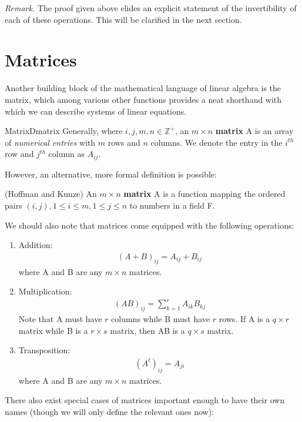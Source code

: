\documentclass[oneside]{book}
\begin{document}
	\textit{Remark.} The proof given above elides an explicit statement of the invertibility of each of these operations. This will be clarified in the next section.
	
	\newpage
	
	\section{Matrices}
	
	Another building block of the mathematical language of linear algebra is the matrix, which among various other functions provides a neat shorthand with which we can describe systems of linear equations.
	
	\begin{defn}{Matrix}{Dmatrix}
		Generally, where $i,j,m,n \in \mathbb{Z^+}$, an $m \times n$ \textbf{matrix} A is an array of \textit{numerical entries} with $m$ rows and $n$ columns. We denote the entry in the $i^{th}$ row and $j^{th}$ column as $A_{ij}$. 
		
		However, an alternative, more formal definition is possible:
		
		(Hoffman and Kunze) An $m \times n$ \textbf{matrix} A is a function mapping the ordered pairs $(i,j), 1 \leq i \leq m, 1 \leq j \leq n$ to numbers in a field F.
	\end{defn}
	We should also note that matrices come equipped with the following operations:
	\begin{enumerate}
		\item Addition: 
			\begin{align*}
				(A+B)_{ij}=A_{ij}+B_{ij}
			\end{align*}
		where A and B are any $m \times n$ matrices.
		\item Multiplication: 
			\begin{align*}
				(AB)_{ij}=\sum_{k=1}^{r}{A_{ik}B_{kj}} 
			\end{align*}
		Note that A must have $r$ columns while B must have $r$ rows. If A is a $q \times r$ matrix while B is a $r \times s$ matrix, then AB is a $q \times s$ matrix.
		\item Transposition:
		\begin{align*}
			(A^t)_{ij}=A_{ji}
		\end{align*} 
		where A and B are any $m \times n$ matrices.
	\end{enumerate}

	There also exist special cases of matrices important enough to have their own names (though we will only define the relevant ones now):
	
\end{document}
